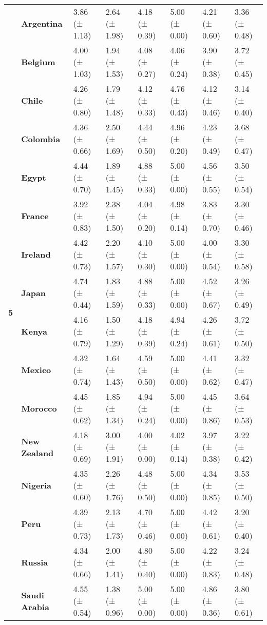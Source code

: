 \begin{longtable}{llllllll}
\cline{1-8}
\multirow[t]{19}{*}{\textbf{5}} & \textbf{Argentina} & 3.86 (± 1.13) & 2.64 (± 1.98) & 4.18 (± 0.39) & 5.00 (± 0.00) & 4.21 (± 0.60) & 3.36 (± 0.48) \\
\textbf{} & \textbf{Belgium} & 4.00 (± 1.03) & 1.94 (± 1.53) & 4.08 (± 0.27) & 4.06 (± 0.24) & 3.90 (± 0.38) & 3.72 (± 0.45) \\
\textbf{} & \textbf{Chile} & 4.26 (± 0.80) & 1.79 (± 1.48) & 4.12 (± 0.33) & 4.76 (± 0.43) & 4.12 (± 0.46) & 3.14 (± 0.40) \\
\textbf{} & \textbf{Colombia} & 4.36 (± 0.66) & 2.50 (± 1.69) & 4.44 (± 0.50) & 4.96 (± 0.20) & 4.23 (± 0.49) & 3.68 (± 0.47) \\
\textbf{} & \textbf{Egypt} & 4.44 (± 0.70) & 1.89 (± 1.45) & 4.88 (± 0.33) & 5.00 (± 0.00) & 4.56 (± 0.55) & 3.50 (± 0.54) \\
\textbf{} & \textbf{France} & 3.92 (± 0.83) & 2.38 (± 1.50) & 4.04 (± 0.20) & 4.98 (± 0.14) & 3.83 (± 0.70) & 3.30 (± 0.46) \\
\textbf{} & \textbf{Ireland} & 4.42 (± 0.73) & 2.20 (± 1.57) & 4.10 (± 0.30) & 5.00 (± 0.00) & 4.00 (± 0.54) & 3.30 (± 0.58) \\
\textbf{} & \textbf{Japan} & 4.74 (± 0.44) & 1.83 (± 1.59) & 4.88 (± 0.33) & 5.00 (± 0.00) & 4.52 (± 0.67) & 3.26 (± 0.49) \\
\textbf{} & \textbf{Kenya} & 4.16 (± 0.79) & 1.50 (± 1.29) & 4.18 (± 0.39) & 4.94 (± 0.24) & 4.26 (± 0.61) & 3.72 (± 0.50) \\
\textbf{} & \textbf{Mexico} & 4.32 (± 0.74) & 1.64 (± 1.43) & 4.59 (± 0.50) & 5.00 (± 0.00) & 4.41 (± 0.62) & 3.32 (± 0.47) \\
\textbf{} & \textbf{Morocco} & 4.45 (± 0.62) & 1.85 (± 1.34) & 4.94 (± 0.24) & 5.00 (± 0.00) & 4.45 (± 0.86) & 3.64 (± 0.53) \\
\textbf{} & \textbf{New Zealand} & 4.18 (± 0.69) & 3.00 (± 1.91) & 4.00 (± 0.00) & 4.02 (± 0.14) & 3.97 (± 0.38) & 3.22 (± 0.42) \\
\textbf{} & \textbf{Nigeria} & 4.35 (± 0.60) & 2.26 (± 1.76) & 4.48 (± 0.50) & 5.00 (± 0.00) & 4.34 (± 0.85) & 3.53 (± 0.50) \\
\textbf{} & \textbf{Peru} & 4.39 (± 0.73) & 2.13 (± 1.73) & 4.70 (± 0.46) & 5.00 (± 0.00) & 4.42 (± 0.61) & 3.20 (± 0.40) \\
\textbf{} & \textbf{Russia} & 4.34 (± 0.66) & 2.00 (± 1.41) & 4.80 (± 0.40) & 5.00 (± 0.00) & 4.22 (± 0.83) & 3.24 (± 0.48) \\
\textbf{} & \textbf{Saudi Arabia} & 4.55 (± 0.54) & 1.38 (± 0.96) & 5.00 (± 0.00) & 5.00 (± 0.00) & 4.86 (± 0.36) & 3.80 (± 0.61) \\

\end{longtable}
